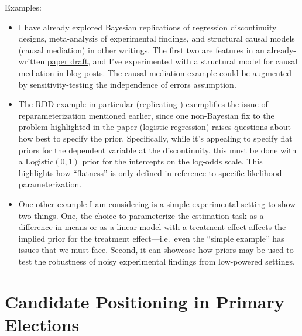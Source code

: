 \documentclass[12pt
              ]{article}
\begin{document}
Examples:
\begin{itemize}
  \item I have already explored Bayesian replications of regression discontinuity designs, meta-analysis of experimental findings, and structural causal models (causal mediation) in other writings.
  The first two are features in an already-written \href{https://github.com/mikedecr/causal-bayes/blob/master/writing/causal-bayes-paper.pdf}{paper draft}, and I've experimented with a structural model for causal mediation in \href{https://mikedecr.github.io/post/bayes-mediation/}{blog posts}.
  The causal mediation example could be augmented by sensitivity-testing the independence of errors assumption.
  \item The RDD example in particular (replicating \cite{hall:2015:extremists}) exemplifies the issue of reparameterization mentioned earlier, since one non-Bayesian fix to the problem highlighted in the paper (logistic regression) raises questions about how best to specify the prior.
  Specifically, while it's appealing to specify flat priors for the dependent variable at the discontinuity, this must be done with a $\mathrm{Logistic}(0, 1)$ prior for the  intercepts on the log-odds scale.
  This highlights how ``flatness'' is only defined in reference to specific likelihood parameterization.
  \item One other example I am considering is a simple experimental setting to show two things.
  One, the choice to parameterize the estimation task as a difference-in-means or as a linear model with a treatment effect affects the implied prior for the treatment effect---i.e.\ even the ``simple example'' has issues that we must face.
  Second, it can showcase how priors may be used to test the robustness of noisy experimental findings from low-powered settings.
\end{itemize}

\section{Candidate Positioning in Primary Elections}
\end{document}
